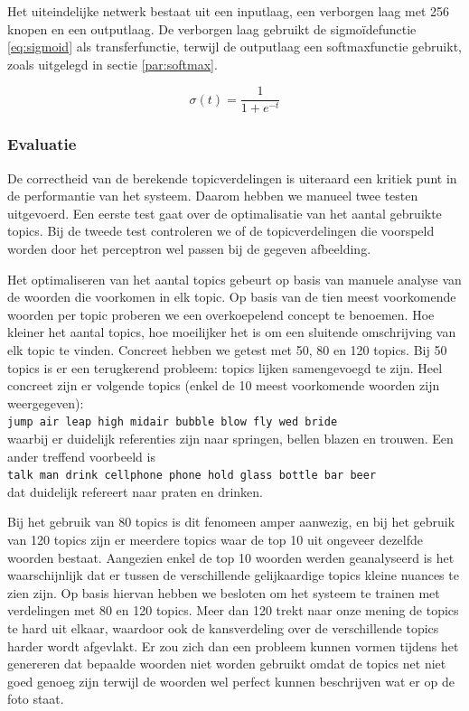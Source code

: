 Het uiteindelijke netwerk bestaat uit een inputlaag, een verborgen laag met 256 knopen en een outputlaag. De verborgen laag gebruikt de sigmo\"idefunctie \eqref{eq:sigmoid} als transferfunctie, terwijl de outputlaag een softmaxfunctie gebruikt, zoals uitgelegd in sectie \ref{par:softmax}.

\begin{equation}
    \sigma(t) = \frac{1}{1 + e^{-t}}
    \label{eq:sigmoid}
\end{equation}

\subsubsection{Evaluatie}
\label{subs:Evaluatie}
De correctheid van de berekende topicverdelingen is uiteraard een kritiek punt in de performantie van het systeem. Daarom hebben we manueel twee testen uitgevoerd. Een eerste test gaat over de optimalisatie van het aantal gebruikte topics. Bij de tweede test controleren we of de topicverdelingen die voorspeld worden door het perceptron wel passen bij de gegeven afbeelding.

Het optimaliseren van het aantal topics gebeurt op basis van manuele analyse van de woorden die voorkomen in elk topic. Op basis van de tien meest voorkomende woorden per topic proberen we een overkoepelend concept te benoemen. Hoe kleiner het aantal topics, hoe moeilijker het is om een sluitende omschrijving van elk topic te vinden. Concreet hebben we getest met 50, 80 en 120 topics. Bij 50 topics is er een terugkerend probleem: topics lijken samengevoegd te zijn. Heel concreet zijn er volgende topics (enkel de 10 meest voorkomende woorden zijn weergegeven): \\
\texttt{jump air leap high midair bubble blow fly wed bride}
\\
waarbij er duidelijk referenties zijn naar springen, bellen blazen en trouwen. Een ander treffend voorbeeld is \\
\texttt{talk man drink cellphone phone hold glass bottle bar beer}
\\ dat duidelijk refereert naar praten en drinken.

Bij het gebruik van 80 topics is dit fenomeen amper aanwezig, en bij het gebruik van 120 topics zijn er meerdere topics waar de top 10 uit ongeveer dezelfde woorden bestaat. Aangezien enkel de top 10 woorden werden geanalyseerd is het waarschijnlijk dat er tussen de verschillende gelijkaardige topics kleine nuances te zien zijn. Op basis hiervan hebben we besloten om het systeem te trainen met verdelingen met 80 en 120 topics. Meer dan 120 trekt naar onze mening de topics te hard uit elkaar, waardoor ook de kansverdeling over de verschillende topics harder wordt afgevlakt. Er zou zich dan een probleem kunnen vormen tijdens het genereren dat bepaalde woorden niet worden gebruikt omdat de topics net niet goed genoeg zijn terwijl de woorden wel perfect kunnen beschrijven wat er op de foto staat.

